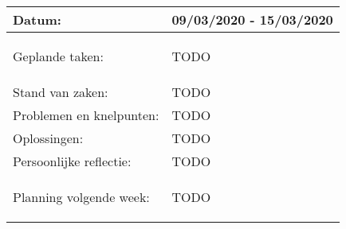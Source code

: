 \begin{tabularx}{\textwidth}{| l | X |}
  \hline
  Datum: & 09/03/2020 - 15/03/2020\\
  \hline
  Geplande taken: &
  \begin{compactitem}
    \item TODO
  \end{compactitem}\\
  \hline
  Stand van zaken: & TODO\\
  \hline
  Problemen en knelpunten: & TODO\\
  \hline
  Oplossingen: & TODO\\
  \hline
  Persoonlijke reflectie: & TODO\\
  \hline
  Planning volgende week: & 
  \begin{compactitem}
    \item TODO
  \end{compactitem}\\
  \hline
\end{tabularx}